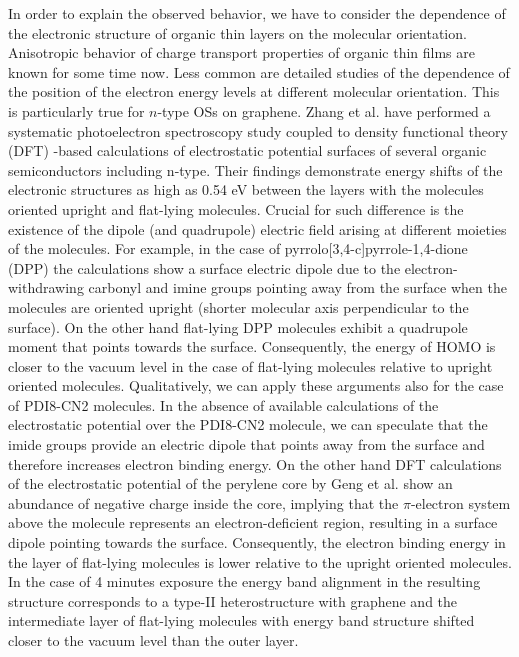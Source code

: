 \documentclass[preprint,aip,jap]{revtex4-2}
\begin{document}
In order to explain the observed behavior, we have to consider the dependence of the electronic structure of organic thin layers on the molecular orientation.
  Anisotropic behavior of charge transport properties of organic thin films are known for some time now\cite{sundar-2004}.
 Less common are detailed studies of the dependence of the position of the electron energy levels at different molecular orientation.
 This is particularly true for $n$-type OSs on graphene.
 Zhang et al.
\cite{zhang-2016d} have performed a systematic photoelectron spectroscopy study coupled to density functional theory (DFT) -based calculations of electrostatic potential surfaces of several organic semiconductors including n-type.
 Their findings demonstrate energy shifts of the electronic structures as high as 0.54 eV between the layers with the molecules oriented upright and flat-lying molecules.
  Crucial for such difference is the existence of the dipole (and quadrupole) electric field arising at different moieties of the molecules.
 For example, in the case of pyrrolo[3,4-c]pyrrole-1,4-dione (DPP)  the calculations show a surface electric dipole due to the electron-withdrawing carbonyl and imine groups pointing  away from the surface when the molecules are oriented upright (shorter molecular axis perpendicular to the surface).
 On the other hand flat-lying DPP molecules exhibit a quadrupole moment that points towards the surface.
 Consequently, the energy of HOMO is closer to the vacuum level in the case of flat-lying molecules relative to upright oriented molecules.
Qualitatively, we can apply these arguments also for the case of PDI8-CN2 molecules.
 In the absence of available calculations of the electrostatic potential over the PDI8-CN2 molecule, we can speculate that the imide groups provide an electric dipole that points away from the surface and therefore increases electron binding energy.
 On the other hand DFT calculations of the electrostatic potential of the perylene core by Geng et al.
\cite{geng-2012} show an abundance of negative charge inside the core, implying  that the $\pi$-electron system above the molecule represents an electron-deficient region, resulting in a surface dipole pointing towards the surface.
 Consequently, the electron binding energy in the layer of flat-lying molecules is lower relative to the upright oriented molecules.
  In the case of 4 minutes exposure the energy band alignment in the resulting structure corresponds to a type-II heterostructure with graphene and the intermediate layer of flat-lying molecules with energy band structure shifted closer to the vacuum level than the outer layer.
\end{document}
